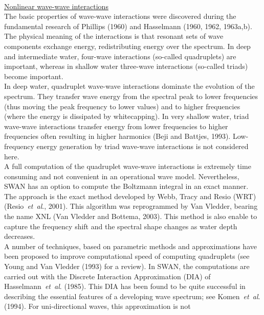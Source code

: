 \documentclass[12pt]{book}
\begin{document}
\\[2ex]
\noindent
\underline{Nonlinear wave-wave interactions}\\[2ex]
The basic properties of wave-wave interactions were discovered during the fundamental research
of Phillips (1960) and Hasselmann (1960, 1962, 1963a,b). The physical meaning of the interactions is that
resonant sets of wave components exchange energy, redistributing energy over the spectrum. In deep
and intermediate water, four-wave interactions (so-called quadruplets) are important, whereas
in shallow water three-wave interactions (so-called triads) become important.
\\[2ex]
\noindent
In deep water, quadruplet wave-wave interactions dominate the evolution of the spectrum. They transfer
wave energy from the spectral peak to lower frequencies (thus moving the peak frequency to lower values)
and to higher frequencies (where the energy is dissipated by whitecapping). In very shallow water, triad
wave-wave interactions transfer energy from lower frequencies to higher frequencies often resulting in
higher harmonics (Beji and Battjes, 1993). Low-frequency energy generation by triad wave-wave
interactions is not considered here.
\\[2ex]
\noindent
A full computation of the quadruplet wave-wave interactions is extremely time consuming and not
convenient in an operational wave model. Nevertheless, SWAN has an option to compute the Boltzmann integral
in an exact manner. The approach is the exact method developed by Webb, Tracy and Resio (WRT)
(Resio~{\it et~al}., 2001). This algorithm was reprogrammed by Van Vledder, bearing the name XNL
(Van Vledder and Bottema, 2003). This method is also enable to capture the frequency shift and the spectral
shape changes as water depth decreases.
\\[2ex]
\noindent
A number of techniques, based on parametric methods and approximations have been proposed to
improve computational speed of computing quadruplets (see Young and Van Vledder (1993) for a review). In SWAN,
the computations are carried out with the Discrete Interaction Approximation (DIA) of Hasselmann~{\it et~al}.
(1985). This DIA has been found to be quite successful in describing the essential features of a
developing wave spectrum; see Komen~{\it et~al}. (1994). For uni-directional waves, this approximation is not
\end{document}
